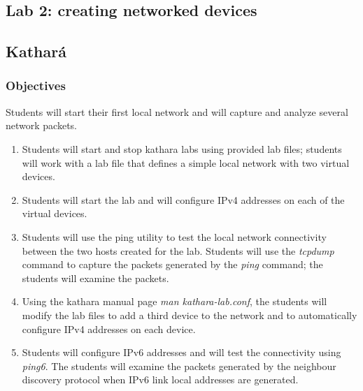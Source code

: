\documentclass[12pt]{book}
\newcommand{\kathara}{Kathar\'a}
\begin{document}
\begin{enumerate}[label=\arabic*.]
  

\chapter{Lab 2: creating networked devices}

\section{\kathara}

\subsection{Objectives}

Students will start their first local network and will capture and analyze several network packets. 

\begin{enumerate}[label=Objective \arabic*]

\item\label{startstop} Students will start and stop kathara labs using provided lab files; students will work with a lab file that defines a simple local network with two virtual devices.

\item\label{ipv4.2} Students will start the lab and will configure IPv4 addresses on each of the virtual devices. 

\item\label{tcpdump}  Students will use the ping utility to test the local network connectivity between the two hosts created for the lab. Students will use the \emph{tcpdump} command to capture the packets generated by the \emph{ping} command; the students will examine the packets.

\item\label{modifylab} Using the kathara manual page \emph{man kathara-lab.conf}, the students will modify the lab files to add a third device to the network and to automatically configure IPv4 addresses on each device.

\item\label{ipv6.2}  Students will configure IPv6 addresses and will test the
  connectivity using \emph{ping6}. The students will examine the packets generated by the neighbour discovery protocol when IPv6 link local addresses are generated. 

\end{enumerate}


\end{enumerate}
\end{document}
